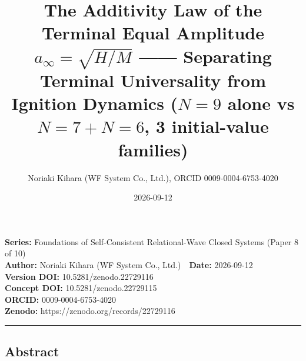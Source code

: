 \documentclass[
  a4paper,
]{ltjsarticle}
\title{The Additivity Law of the Terminal Equal Amplitude
\(a_\infty=\sqrt{H/M}\) ------ Separating Terminal Universality from
Ignition Dynamics (\(N=9\) alone vs \(N=7+N=6\), 3 initial-value
families)}
\author{Noriaki Kihara (WF System Co., Ltd.), ORCID 0009-0004-6753-4020}
\date{2026-09-12}
\begin{document}
\maketitle

\textbf{Series:} Foundations of Self-Consistent Relational-Wave Closed
Systems (Paper 8 of 10)\\
\textbf{Author:} Noriaki Kihara (WF System Co., Ltd.)　\textbf{Date:}
2026-09-12\\
\textbf{Version DOI:} 10.5281/zenodo.22729116\\
\textbf{Concept DOI:} 10.5281/zenodo.22729115\\
\textbf{ORCID:} 0009-0004-6753-4020\\
\textbf{Zenodo:} https://zenodo.org/records/22729116\\

\begin{center}\rule{0.5\linewidth}{0.5pt}\end{center}

\subsection{Abstract}\label{abstract}
\end{document}
